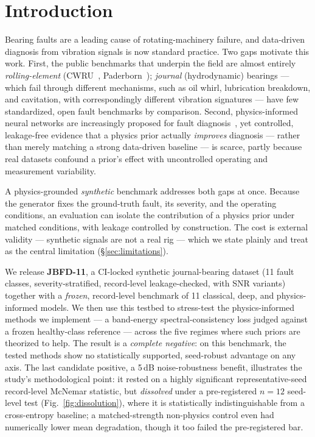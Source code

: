 \documentclass{article}
\begin{document}
\section{Introduction}
\label{sec:intro}
Bearing faults are a leading cause of rotating-machinery failure, and
data-driven diagnosis from vibration signals is now standard practice. Two gaps
motivate this work. First, the public benchmarks that underpin the field are
almost entirely \emph{rolling-element} (CWRU~\citep{smith2015cwru},
Paderborn~\citep{lessmeier2016paderborn}); \emph{journal} (hydrodynamic)
bearings --- which fail through different mechanisms, such as oil whirl,
lubrication breakdown, and cavitation, with correspondingly different vibration
signatures --- have few standardized, open fault benchmarks by comparison.
Second,
physics-informed neural networks are increasingly proposed for fault
diagnosis~\citep{raissi2019pinn}, yet controlled, leakage-free evidence that a
physics prior actually \emph{improves} diagnosis --- rather than merely matching
a strong data-driven baseline --- is scarce, partly because real datasets
confound a prior's effect with uncontrolled operating and measurement
variability.

A physics-grounded \emph{synthetic} benchmark addresses both gaps at once.
Because the generator fixes the ground-truth fault, its severity, and the
operating conditions, an evaluation can isolate the contribution of a physics
prior under matched conditions, with leakage controlled by construction. The
cost is external validity --- synthetic signals are not a real rig --- which we
state plainly and treat as the central limitation (\S\ref{sec:limitations}).

We release \textbf{JBFD-11}, a CI-locked synthetic journal-bearing dataset (11
fault classes, severity-stratified, record-level leakage-checked, with SNR
variants) together with a \emph{frozen}, record-level benchmark of 11 classical,
deep, and physics-informed models. We then use this testbed to stress-test the
physics-informed methods we implement --- a band-energy spectral-consistency loss
judged against a frozen healthy-class reference --- across the five regimes where
such priors are theorized to help. The result is a \emph{complete negative}: on
this benchmark, the tested methods show no statistically supported, seed-robust
advantage on any axis. The last candidate positive, a 5\,dB noise-robustness
benefit, illustrates the study's methodological point: it rested on a highly
significant representative-seed record-level McNemar statistic, but
\emph{dissolved} under a pre-registered $n{=}12$ seed-level test
(Fig.~\ref{fig:dissolution}), where it is statistically indistinguishable from a
cross-entropy baseline; a matched-strength non-physics control even had
numerically lower mean degradation, though it too failed the pre-registered bar.
\end{document}
